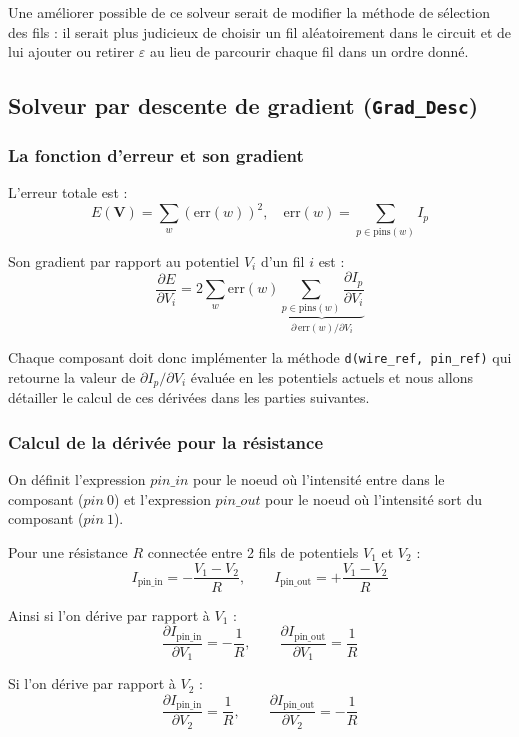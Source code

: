 \documentclass[12pt,a4paper]{article}
\begin{document}
Une améliorer possible de ce solveur serait de modifier la méthode de sélection des fils : il serait 
plus judicieux de choisir un fil aléatoirement dans le circuit et de lui ajouter ou retirer $\varepsilon$ au lieu de parcourir
chaque fil dans un ordre donné.

\subsection{Solveur par descente de gradient (\texttt{Grad\_Desc})}

\subsubsection{La fonction d'erreur et son gradient}

L'erreur totale est :
\[
  E(\mathbf{V}) = \sum_{w} \left(\text{err}(w)\right)^2, \quad
  \text{err}(w) = \sum_{p \in \text{pins}(w)} I_p
\]

Son gradient par rapport au potentiel $V_i$ d'un fil $i$ est :
\[
  \frac{\partial E}{\partial V_i}
  = 2 \sum_{w} \text{err}(w)
    \underbrace{\sum_{p \in \text{pins}(w)} \frac{\partial I_p}{\partial V_i}}_{\partial\,\text{err}(w)/\partial V_i}
\]

Chaque composant doit donc implémenter la méthode \texttt{d(wire\_ref, pin\_ref)} qui retourne la valeur de 
$\partial I_p / \partial V_i$ évaluée en les potentiels actuels et nous allons détailler le calcul de ces dérivées dans les parties suivantes.

\subsubsection{Calcul de la dérivée pour la résistance}

On définit l'expression $pin\_in$ pour le noeud où l'intensité entre dans le composant ($pin\ 0$) et l'expression
$pin\_out$ pour le noeud où l'intensité sort du composant ($pin\ 1$).

Pour une résistance $R$ connectée entre 2 fils de potentiels $V_1$ et $V_2$ :
\[
  I_{\text{pin\_in}} = -\frac{V_1 - V_2}{R}, \qquad I_{\text{pin\_out}} = +\frac{V_1 - V_2}{R}
\]

Ainsi si l'on dérive par rapport à $V_1$ :
\[
  \frac{\partial I_{\text{pin\_in}}}{\partial V_1} = -\frac{1}{R}, \qquad \frac{\partial I_{\text{pin\_out}}}{\partial V_1} = \frac{1}{R}
\]

Si l'on dérive par rapport à $V_2$ :
\[
  \frac{\partial I_{\text{pin\_in}}}{\partial V_2} = \frac{1}{R}, \qquad \frac{\partial I_{\text{pin\_out}}}{\partial V_2} = -\frac{1}{R}
\]
\end{document}
